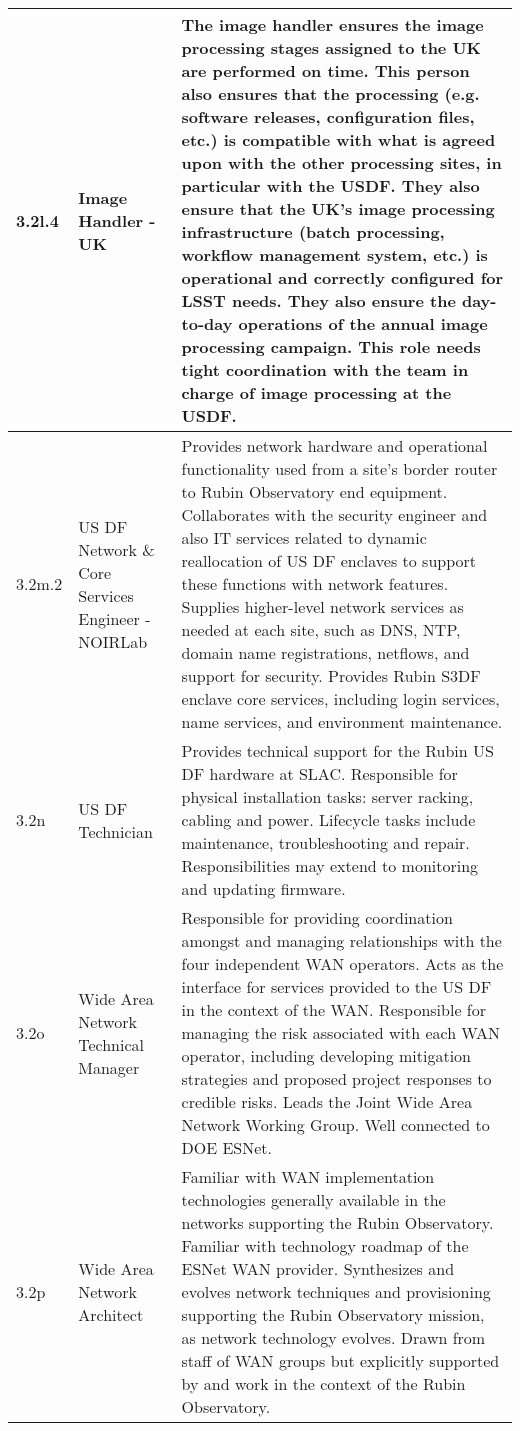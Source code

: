 \begin{longtable} {|p{}|p{}|p{}|}
{3.2l.4}&{Image Handler - UK}&{The image handler ensures the image processing stages assigned to the UK are performed on time. This person also ensures that the processing (e.g. software releases, configuration files, etc.) is compatible with what is agreed upon with the other processing sites, in particular with the USDF. They also ensure that the UK's image processing infrastructure (batch processing, workflow management system, etc.) is operational and correctly configured for LSST needs. They also ensure the day-to-day operations of the annual image processing campaign. This role needs tight coordination with the team in charge of image processing at the USDF.} \\ \hline
{3.2m.2}&{US DF Network \& Core Services Engineer - NOIRLab}&{Provides network hardware and operational functionality used from a site's border router to Rubin Observatory end equipment. Collaborates with the security engineer and also IT services related to dynamic reallocation of US DF enclaves to support these functions with network features. Supplies higher-level network services as needed at each site, such as DNS, NTP, domain name registrations, netflows, and support for security. Provides Rubin S3DF enclave core services, including login services, name services, and environment maintenance.} \\ \hline
{3.2n}&{US DF Technician}&{Provides technical support for the Rubin US DF hardware at SLAC. Responsible for physical installation tasks: server racking, cabling and power. Lifecycle tasks include maintenance, troubleshooting and repair. Responsibilities may extend to monitoring and updating firmware.} \\ \hline
{3.2o}&{Wide Area Network Technical Manager}&{Responsible for providing coordination amongst and managing relationships with the four independent WAN operators. Acts as the interface for services provided to the US DF in the context of the WAN. Responsible for managing the risk associated with each WAN operator, including developing mitigation strategies and proposed project responses to credible risks. Leads the Joint Wide Area Network Working Group. Well connected to DOE ESNet.} \\ \hline
{3.2p}&{Wide Area Network Architect}&{Familiar with WAN implementation technologies generally available in the networks supporting the Rubin Observatory. Familiar with technology roadmap of the ESNet WAN provider. Synthesizes and evolves network techniques and provisioning supporting the Rubin Observatory mission, as network technology evolves. Drawn from staff of WAN groups but explicitly supported by and work in the context of the Rubin Observatory.} \\ \hline

\end{longtable}
